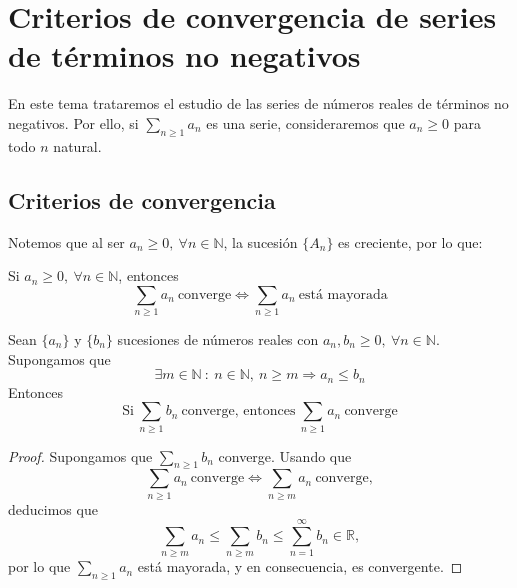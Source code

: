 \chapter{Criterios de convergencia de series de términos no negativos}\label{chp:Tema10}

En este tema trataremos el estudio de las series de números reales de términos no negativos. Por ello, si $\displaystyle\sum_{n \geq 1} a_n$ es una serie, consideraremos que $a_n \geq 0$ para todo $n$ natural.


\section{Criterios de convergencia}
Notemos que al ser $a_n \geq 0, ~ \forall n \in \mathbb{N}$, la sucesión $\{A_n\}$ es creciente, por lo que:
\begin{prop}
    Si $a_n \geq 0, ~ \forall n \in \mathbb{N}$, entonces
    \begin{equation*}
        \displaystyle\sum_{n \geq 1} a_n ~ \text{converge} \Longleftrightarrow  \displaystyle\sum_{n \geq 1} a_n ~ \text{está mayorada}
    \end{equation*}
\end{prop}

\begin{prop}
    Sean $\{a_n\}$ y $\{b_n\}$ sucesiones de números reales con $a_n, b_n \geq 0, ~ \forall n \in \mathbb{N}$.
    Supongamos que
    \begin{equation*}
        \exists m \in \mathbb{N} ~:~ n \in \mathbb{N}, ~ n \geq m \Longrightarrow a_n \leq b_n
    \end{equation*}
    Entonces
    \begin{equation*}
        \text{Si} ~\displaystyle\sum_{n \geq 1} b_n ~ \text{converge, entonces} ~ \displaystyle\sum_{n \geq 1} a_n ~ \text{converge}
    \end{equation*}
\end{prop}
\begin{proof}
    Supongamos que $\displaystyle\sum_{n \geq 1} b_n$ converge. Usando que
    \begin{equation*}
        \displaystyle\sum_{n \geq 1} a_n ~ \text{converge} \Longleftrightarrow \displaystyle\sum_{n \geq m} a_n ~ \text{converge},
    \end{equation*}
    deducimos que
    \begin{equation*}
        \displaystyle\sum_{n \geq m} a_n \leq \displaystyle\sum_{n \geq m} b_n \leq \displaystyle\sum_{n = 1}^{\infty} b_n \in \mathbb{R},
    \end{equation*}
    por lo que $\displaystyle\sum_{n \geq 1} a_n$ está mayorada, y en consecuencia, es convergente.
\end{proof}

